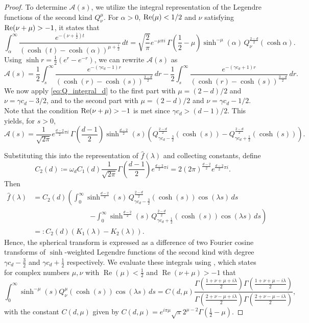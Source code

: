 \documentclass[11pt,a4paper]{article}
\theoremstyle{plain}
\theoremstyle{definition}
\theoremstyle{remark}
\def\cA{\mathcal{A}}
\DeclareMathOperator{\re}{Re}
\begin{document}
\begin{proof}
To determine $\cA(s)$, we utilize the integral representation \cite[Formula 8.715.2]{Zwillinger} of the Legendre functions of the second kind $Q_\nu^\mu$. For $\alpha>0$, ${\rm Re}(\mu) < 1/2$ and $\nu$ satisfying ${\rm Re}(\nu+\mu)>-1$, it states that
\begin{equation}\label{eq:Q_integral_d}
	\int_\alpha^\infty \frac{e^{-(\nu+\frac12)t}}{(\cosh (t)-\cosh(\alpha))^{\mu+\frac{1}{2}}}\,dt
	=
	\sqrt{\frac{2}{\pi}} e^{-\mu\pi i}\,\Gamma\!\left(\frac{1}{2}-\mu\right)\sinh^{-\mu}(\alpha)\,
	Q_\nu^{\frac{2-d}{2}}(\cosh\alpha).
\end{equation}
Using $\sinh r=\frac12(e^r-e^{-r})$, we can rewrite $\cA(s)$ as
\[
\cA(s)
=
\frac12\int_s^\infty
\frac{e^{-(\gamma c_d-1)r}}{(\cosh (r)-\cosh (s))^{\frac{3-d}{2}}}\,dr
- \frac12\int_s^\infty
\frac{e^{-(\gamma c_d+1)r}}{(\cosh (r)-\cosh (s))^{\frac{3-d}{2}}}\,dr.
\]
We now apply \eqref{eq:Q_integral_d} to the first part with $\mu = (2-d)/2$ and $\nu = \gamma c_d - 3/2$, and to the second part with $\mu = (2-d)/2$ and $\nu = \gamma c_d - 1/2$.
Note that the condition ${\rm Re}(\nu+\mu)>-1$ is met since $\gamma c_d > (d-1)/2$.
This yields, for $s>0$,
\[
\cA(s)
=
\frac{1}{\sqrt{2\pi}}e^{\frac{d-2}{2}\pi i}\,\Gamma\!\left(\frac{d-1}{2}\right)\sinh^{\frac{d-2}{2}}(s)
\left(
Q_{\gamma c_d-\frac32}^{\frac{2-d}{2}}(\cosh (s))
-
Q_{\gamma c_d+\frac12}^{\frac{2-d}{2}}(\cosh (s))
\right).
\]


Substituting this into the representation of $\widehat{f}(\lambda)$ and collecting constants, define
\[
C_2(d)
\coloneqq\omega_d C_1(d)\frac{1}{\sqrt{2\pi}}\Gamma\!\left(\frac{d-1}{2}\right)e^{\frac{d-2}{2}\pi i}
=2(2\pi)^{\frac{d-2}{2}}e^{\frac{d-2}{2}\pi i}.
\]
Then
\begin{align*}
	\widehat{f}(\lambda)
	&= C_2(d) \left( \int_0^\infty \sinh^{\frac{d-2}{2}}(s) \, Q_{\gamma c_d - \frac 32}^{\frac{2-d}{2}}(\cosh(s)) \cos(\lambda s) \, ds\right.\\
	&\qquad\qquad\qquad\qquad \left.- \int_0^\infty \sinh^{\frac{d-2}{2}}(s) \, Q_{\gamma c_d+\frac12}^{\frac{2-d}{2}}(\cosh(s)) \cos(\lambda s) \, ds \right)\\
	&=: C_2(d) (K_1(\lambda)-K_2(\lambda)).    
\end{align*}
Hence, the spherical transform is expressed as a difference of two Fourier cosine transforms of $\sinh$-weighted Legendre functions of the second kind with degree $\gamma c_d -\frac{3}{2}$ and $\gamma c_d +\frac{1}{2}$ respectively.
We evaluate these integrals using  \cite[Entry 1.12.47]{Oberhettinger}, which states for complex numbers $\mu,\nu$ with $\re(\mu)<\frac{1}{2}$ and $\re(\nu+\mu)>-1$ that
\begin{equation}\label{eq:cosine_transform}
\int_0^\infty \sinh^{-\mu}(s) Q_\nu^\mu(\cosh(s)) \cos(\lambda s) \,ds
= C(d,\mu) \frac{
\Gamma\left(\frac{1+\nu+\mu+i\lambda}{2}\right)
\Gamma\left(\frac{1+\nu+\mu-i\lambda}{2}\right)
}{
\Gamma\left(\frac{2+\nu-\mu+i\lambda}{2}\right)
\Gamma\left(\frac{2+\nu-\mu-i\lambda}{2}\right)},
\end{equation}
with the constant $C(d,\mu)$ given by $C(d,\mu) = e^{i\pi\mu} \sqrt{\pi} 2^{\mu - 2} \Gamma\left(\frac{1}{2}-\mu\right)$. 


\end{proof}
\end{document}
